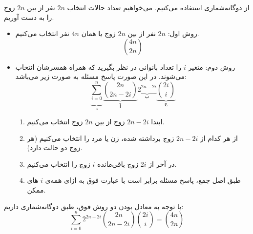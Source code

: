        \p
       از دوگانه‌شماری استفاده می‌کنیم.
         می‌خواهیم تعداد حالات انتخاب
        $2n$
        نفر از بین
        $2n$
        زوج را به دست آوریم.
        
       \begin{itemize}
        \item 
       روش اول:
         $2n$
          نفر از بین 
          $2n$ 
          زوج یا همان 
          $4n$ 
          نفر انتخاب می‌کنیم. 
          $$\binom{4n}{2n}$$
          \item 
       روش دوم:
       متغیر
       $i$
       را
       تعداد بانوانی در نظر بگیرید که همراه همسرشان انتخاب می‌شوند. در این صورت پاسخ مسئله به صورت زیر می‌باشد:
        $$\underbrace{\sum\limits_{i=0}^{n}}_{\text{د}} \underbrace{\binom{2n}{2n-2i}}_{\text{آ}} \underbrace{2^{2n-2i}}_{\text{ب}} \underbrace{\binom{2i}{i}}_{\text{ج}}$$
         
        \begin{enumerate}
         \item 
        ابتدا
       $2n-2i$ 
       زوج از بین
       $2n$ 
       زوج انتخاب می‌کنیم. 
        \item 
       از هر کدام از 
       $2n-2i$
       زوج برداشته‌ شده، زن یا مرد را انتخاب می‌کنیم (هر زوج دو حالت دارد).
       \item 
       در آخر از
       $2i$ 
       زوج باقی‌مانده 
       $i$ 
       زوج را انتخاب می‌کنیم.
       \item 
       طبق اصل جمع،
       پاسخ مسئله برابر است با عبارت فوق 
        به ازای همه‌ی 
        $i$
        های ممکن. 
       \end{enumerate}
       \end{itemize}
        \p
        با توجه به معادل بودن دو روش فوق، طبق دوگانه‌شماری داریم:
        $$\sum\limits_{i=0}^{n} 2^{2n-2i} \binom{2n}{2n-2i} \binom{2i}{i} = \binom{4n}{2n}$$
 